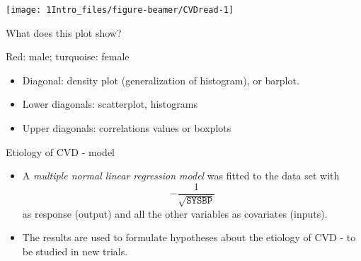 \documentclass[10pt,ignorenonframetext,]{beamer}
\providecommand{\tightlist}{%
  \setlength{\itemsep}{0pt}\setlength{\parskip}{0pt}}
\begin{document}
\begin{frame}

\begin{center}\texttt{[image: 1Intro\_files/figure-beamer/CVDread-1]} \end{center}

What does this plot show?

Red: male; turquoise: female

\end{frame}

\begin{frame}

\begin{itemize}
\tightlist
\item
  Diagonal: density plot (generalization of histogram), or barplot.
\item
  Lower diagonals: scatterplot, histograms
\item
  Upper diagonals: correlations values or boxplots
\end{itemize}

\end{frame}

\begin{frame}

\begin{block}{Etiology of CVD - model}

\begin{itemize}
\item
  A \emph{multiple normal linear regression model} was fitted to the
  data set with \[-\frac{1}{\sqrt{\texttt{SYSBP}}}\] as response
  (output) and all the other variables as covariates (inputs).
\item
  The results are used to formulate hypotheses about the etiology of CVD
  - to be studied in new trials.
\end{itemize}

\end{block}

\end{frame}
\end{document}

